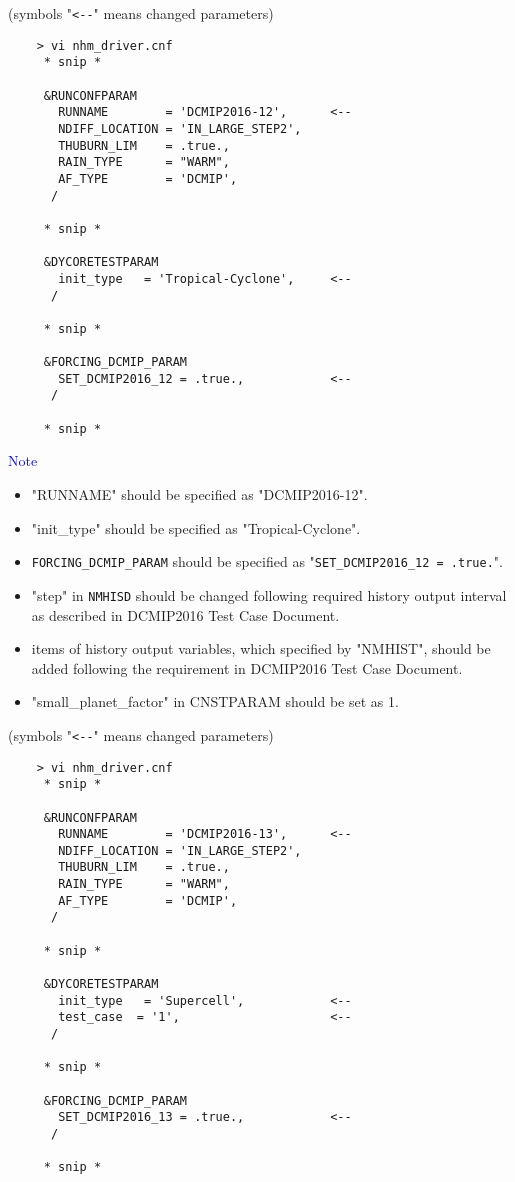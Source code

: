  \vspace{0.5cm}

 (symbols "\verb|<--|" means changed parameters)
 \begin{verbatim}
    > vi nhm_driver.cnf
     * snip *

     &RUNCONFPARAM
       RUNNAME        = 'DCMIP2016-12',      <--
       NDIFF_LOCATION = 'IN_LARGE_STEP2',
       THUBURN_LIM    = .true.,
       RAIN_TYPE      = "WARM",
       AF_TYPE        = 'DCMIP',
      /

     * snip *

     &DYCORETESTPARAM
       init_type   = 'Tropical-Cyclone',     <--
      /

     * snip *

     &FORCING_DCMIP_PARAM
       SET_DCMIP2016_12 = .true.,            <--
      /

     * snip *
 \end{verbatim}

 \noindent \textcolor{blue}{{\sf Note}}
 \begin{itemize}
   \item "RUNNAME" should be specified as "DCMIP2016-12".
   \item "init\_type" should be specified as "Tropical-Cyclone".
   \item \verb|FORCING_DCMIP_PARAM| should be specified as "\verb|SET_DCMIP2016_12 = .true.|".
   \item "step" in \verb|NMHISD| should be changed following required history output interval
           as described in DCMIP2016 Test Case Document.
   \item items of history output variables, which specified by "NMHIST", should be added
         following the requirement in DCMIP2016 Test Case Document.
   \item "small\_planet\_factor" in CNSTPARAM should be set as 1.
 \end{itemize}


 \vspace{0.5cm}

 (symbols "\verb|<--|" means changed parameters)
 \begin{verbatim}
    > vi nhm_driver.cnf
     * snip *

     &RUNCONFPARAM
       RUNNAME        = 'DCMIP2016-13',      <--
       NDIFF_LOCATION = 'IN_LARGE_STEP2',
       THUBURN_LIM    = .true.,
       RAIN_TYPE      = "WARM",
       AF_TYPE        = 'DCMIP',
      /

     * snip *

     &DYCORETESTPARAM
       init_type   = 'Supercell',            <--
       test_case  = '1',                     <--
      /

     * snip *

     &FORCING_DCMIP_PARAM
       SET_DCMIP2016_13 = .true.,            <--
      /

     * snip *
 \end{verbatim}

